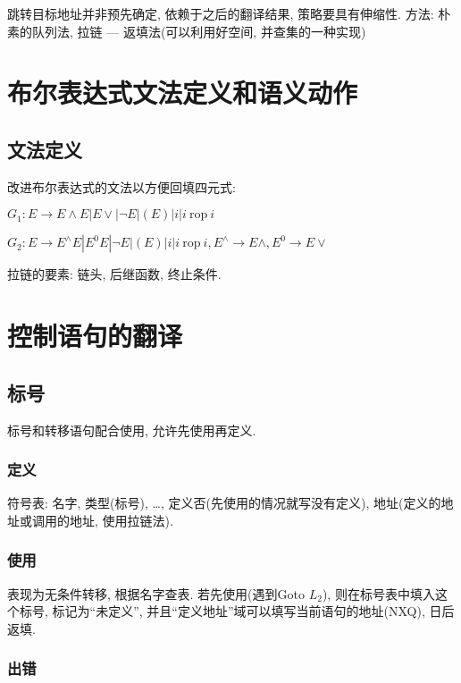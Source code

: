            跳转目标地址并非预先确定, 依赖于之后的翻译结果, 策略要具有伸缩性. 方法: 朴素的队列法, 拉链 --- 返填法(可以利用好空间, 并查集的一种实现)

    \section{布尔表达式文法定义和语义动作}

        \subsection{文法定义}

            改进布尔表达式的文法以方便回填四元式:

            $G_1:E\to E\wedge E|E\vee|\neg E|(E)|i|i\mathrm{\ rop\ }i$

            $G_2:E\to E^\wedge E|E^0 E|\neg E|(E)|i|i\mathrm{\ rop\ }i, E^\wedge\to E\wedge, E^0\to E\vee$

            拉链的要素: 链头, 后继函数, 终止条件.

    \section{控制语句的翻译}

        \subsection{标号}

           标号和转移语句配合使用, 允许先使用再定义.

            \subsubsection{定义}

                符号表: 名字, 类型(标号), \ldots, 定义否(先使用的情况就写没有定义), 地址(定义的地址或调用的地址, 使用\textsf{拉链法}).

            \subsubsection{使用}

                表现为无条件转移, 根据名字查表. 若先使用(遇到Goto $L_2$), 则在标号表中填入这个标号, 标记为``未定义'', 并且``定义地址''域可以填写当前语句的地址(NXQ), 日后返填.

            \subsubsection{出错}

